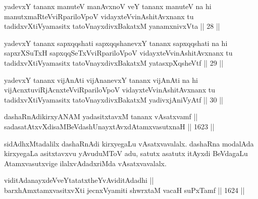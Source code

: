 \begin{shl}
yadevxY tananx manuteV manAvxnoV veY tananx manuteV na hi manutxmaRteVviRpariloVpoV vidayxteV\s vinAshitAvxnanx tu tadidxvXtiVyamasitx tatoV\s nayxdivxBakatxM yanamxnivxVta || 28 ||
\end{shl}

\begin{shl}
yadevxY tananx sapxqqshati sapxqqshanevxY tananx sapxqqshati na hi sapxrXSuTxH sapxqqSeTxVviRpariloVpoV vidayxteV\s vinAshitAvxnanx tu tadidxvXtiVyamasitx tatoV\s nayxdivxBakatxM yatasxpXqsheVtf || 29 ||
\end{shl}

\begin{shl}
yadevxY tananx vijAnAti vijAnanevxY tananx vijAnAti na hi vijAcnxtuviRjAcnxteVviRpariloVpoV vidayxteV\s vinAshitAvxnanx tu tadidxvXtiVyamasitx tatoV\s nayxdivxBakatxM yadivxjAniVyAtf || 30 ||
\end{shl}


\begin{shl}
dashaRnAdikirxyANAM yadasitxtavxM tananx vAsatxvamf || \\
sadasatAtxvXdisaMBeVdashUnayxtAvxdAtamxvasutxnaH \hfill || 1623 ||  
\end{shl}

\begin{artha}
sidAdhxMtadalilx dashaRnAdi kirxyegaLu vAsatxvavalalx. dashaRna modalAda kirxyegaLa asitxtavxvu yAvuduMToV adu, satutx asatutx itAyxdi BeVdagaLu Atamxvasutxvige ilalxvAdadxriMda vAsatxvavalalx.
\end{artha}


\begin{shl}
viditAdanayxdeVveYtatatxtheYvAviditAdadhi || \\
barxhAmxtamxvasitxvXti jecnxVyamiti shwrxtaM vacaH suPxTamf \hfill || 1624 ||  
\end{shl}

